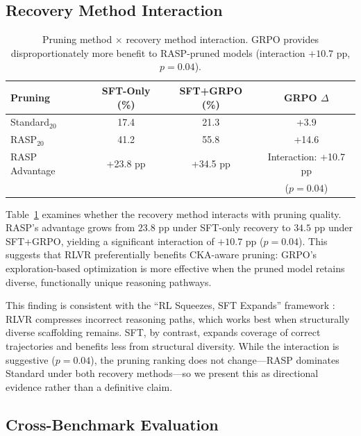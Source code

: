 \documentclass[11pt,a4paper]{article}
\begin{document}
\subsection{Recovery Method Interaction}
\label{sec:interaction}

\begin{table}[t]
\centering
\small
\begin{tabular}{@{}lccc@{}}
\toprule
\textbf{Pruning} & \textbf{SFT-Only (\%)} & \textbf{SFT+GRPO (\%)} & \textbf{GRPO $\Delta$} \\
\midrule
Standard$_{20}$ & 17.4 & 21.3 & +3.9 \\
RASP$_{20}$ & 41.2 & 55.8 & +14.6 \\
\midrule
RASP Advantage & +23.8 pp & +34.5 pp & \multicolumn{1}{c}{Interaction: +10.7 pp} \\
& & & ($p = 0.04$) \\
\bottomrule
\end{tabular}
\caption{Pruning method $\times$ recovery method interaction. GRPO provides disproportionately more benefit to RASP-pruned models (interaction $+10.7$ pp, $p = 0.04$).}
\label{tab:interaction}
\end{table}

Table~\ref{tab:interaction} examines whether the recovery method interacts with pruning quality. RASP's advantage grows from $23.8$ pp under SFT-only recovery to $34.5$ pp under SFT+GRPO, yielding a significant interaction of $+10.7$ pp ($p = 0.04$). This suggests that RLVR preferentially benefits CKA-aware pruning: GRPO's exploration-based optimization is more effective when the pruned model retains diverse, functionally unique reasoning pathways.

This finding is consistent with the ``RL Squeezes, SFT Expands'' framework \cite{rlsqueezes2026}: RLVR compresses incorrect reasoning paths, which works best when structurally diverse scaffolding remains. SFT, by contrast, expands coverage of correct trajectories and benefits less from structural diversity. While the interaction is suggestive ($p = 0.04$), the pruning ranking does not change---RASP dominates Standard under both recovery methods---so we present this as directional evidence rather than a definitive claim.

\subsection{Cross-Benchmark Evaluation}
\end{document}

